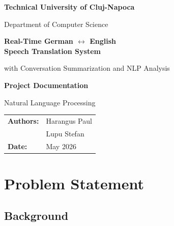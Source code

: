 \documentclass[12pt,a4paper]{report}
\begin{document}
\begin{titlepage}
  \centering
  \vspace*{2cm}
  {\Large\bfseries Technical University of Cluj-Napoca \par}
  \vspace{0.5cm}
  {\large Department of Computer Science \par}
  \vspace{3cm}

  \begin{mdframed}[linecolor=accent,linewidth=2pt,innertopmargin=16pt,innerbottommargin=16pt]
    \centering
    {\Huge\bfseries\color{accentdark}
      Real-Time German $\leftrightarrow$ English\\[8pt]
      Speech Translation System\par}
    \vspace{8pt}
    {\large\color{accent} with Conversation Summarization and NLP Analysis\par}
  \end{mdframed}

  \vspace{2.5cm}
  {\large\bfseries Project Documentation\par}
  \vspace{0.4cm}
  {\large Natural Language Processing\par}

  \vfill
  \begin{tabular}{ll}
    \textbf{Authors:}  & Harangus Paul \\[4pt]
                       & Lupu Stefan   \\[12pt]
    \textbf{Date:}     & May 2026
  \end{tabular}
\end{titlepage}

\tableofcontents
\newpage

\chapter{Problem Statement}

\section{Background}
\end{document}
